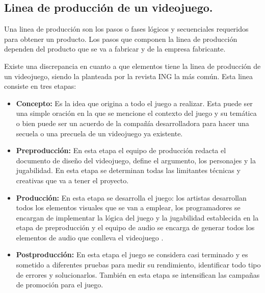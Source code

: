 	\subsection{Linea de producción de un videojuego.}\label{Pipelinevideojuego}
	Una linea de producción son los pasos o fases lógicos y secuenciales requeridos 
	para obtener un producto. Los pasos que componen la linea de producción dependen 
	del producto que se va a fabricar y de la empresa fabricante. 
        \\
        \par    
        Existe una discrepancia en cuanto a que elementos tiene la linea de producción 
        de un videojuego, siendo la planteada por la revista ING la más común. Esta 
        linea consiste en tres etapas\cite{Ref_Desarrollo}:
	\begin{itemize}
		\item \textbf{Concepto:} Es la idea que origina a todo el juego a 
                realizar. Esta puede ser una simple oración en la que se mencione el 
                contexto del juego y su temática o bien puede ser un acuerdo de la 
                compañía desarrolladora para hacer una secuela o una precuela de un 
                videojuego ya existente\cite{Ref_Desarrollo}.
		\item \textbf{Preproducción:} En esta etapa el equipo de producción redacta 
		el documento de diseño del videojuego, define el argumento, los personajes y 
		la jugabilidad. En esta etapa se determinan todas las limitantes técnicas 
		y creativas que va a tener el proyecto\cite{Ref_Desarrollo}.
		\item \textbf{Producción:} En esta etapa se desarrolla el juego: los artistas 
		desarrollan todos los elementos visuales que se van a emplear, los 
		programadores se encargan de implementar la lógica del juego y la jugabilidad 
		establecida en la etapa de preproducción y el equipo de audio se encarga de 
		generar todos los elementos de audio que conlleva el videojuego
		\cite{Ref_Desarrollo}.
		\item \textbf{Postproducción:} En esta etapa el juego se considera casi 
		terminado y es sometido a diferentes pruebas para medir su rendimiento, 
		identificar todo tipo de errores y solucionarlos. También en esta etapa se 
		intensifican las campañas de promoción para el juego\cite{Ref_Desarrollo}.
\end{itemize}	 

	
	
	
	